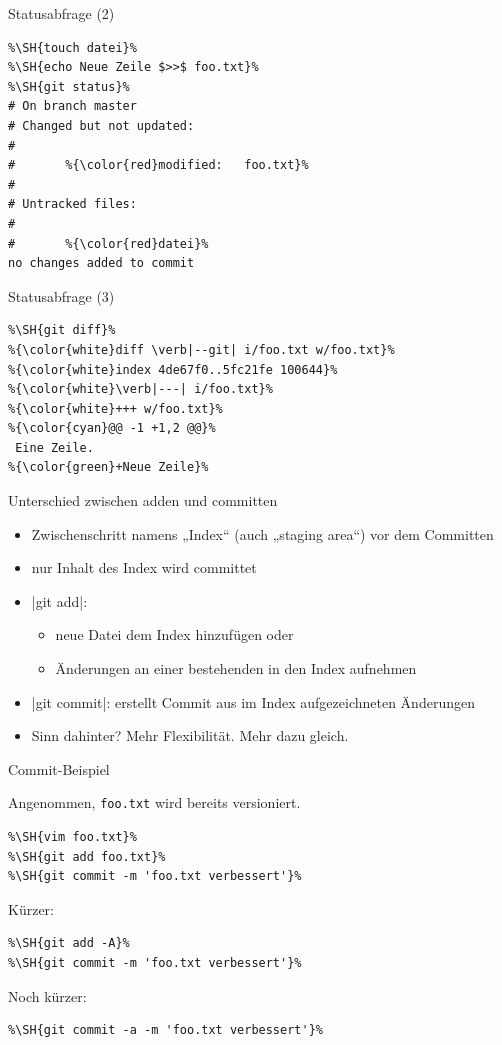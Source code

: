 \begin{frame}[fragile=singleslide]{Statusabfrage (2)}
\begin{example}
\begin{lstlisting}
%\SH{touch datei}%
%\SH{echo Neue Zeile $>>$ foo.txt}%
%\SH{git status}%
# On branch master
# Changed but not updated:
#
#       %{\color{red}modified:   foo.txt}%
#
# Untracked files:
#
#       %{\color{red}datei}%
no changes added to commit
\end{lstlisting}
\end{example}
\end{frame}

\begin{frame}[fragile=singleslide]{Statusabfrage (3)}
\begin{example}
\begin{lstlisting}
%\SH{git diff}%
%{\color{white}diff \verb|--git| i/foo.txt w/foo.txt}%
%{\color{white}index 4de67f0..5fc21fe 100644}%
%{\color{white}\verb|---| i/foo.txt}%
%{\color{white}+++ w/foo.txt}%
%{\color{cyan}@@ -1 +1,2 @@}%
 Eine Zeile.
%{\color{green}+Neue Zeile}%
\end{lstlisting}
\end{example}
\end{frame}

\begin{frame}[fragile=singleslide]{Unterschied zwischen adden und committen}
\begin{itemize}
	\item Zwischenschritt namens „Index“ (auch „staging area“) vor dem Committen
	\item nur Inhalt des Index wird committet
	\item \TYPE|git add|:\begin{itemize}
		\item neue Datei dem Index hinzufügen oder
		\item Änderungen an einer bestehenden in den Index aufnehmen
	\end{itemize}
	\item \TYPE|git commit|: erstellt Commit aus im Index aufgezeichneten Änderungen
	\item Sinn dahinter? Mehr Flexibilität. Mehr dazu gleich.
\end{itemize}
\end{frame}

\begin{frame}[fragile=singleslide]{Commit-Beispiel}
\begin{example}
\small{Angenommen, \texttt{foo.txt} wird bereits versioniert.}
\begin{lstlisting}
%\SH{vim foo.txt}%
%\SH{git add foo.txt}%
%\SH{git commit -m 'foo.txt verbessert'}%
\end{lstlisting}
\small{Kürzer:}
\begin{lstlisting}
%\SH{git add -A}%
%\SH{git commit -m 'foo.txt verbessert'}%
\end{lstlisting}
\small{Noch kürzer:}
\begin{lstlisting}
%\SH{git commit -a -m 'foo.txt verbessert'}%
\end{lstlisting}
\end{example}
\end{frame}

